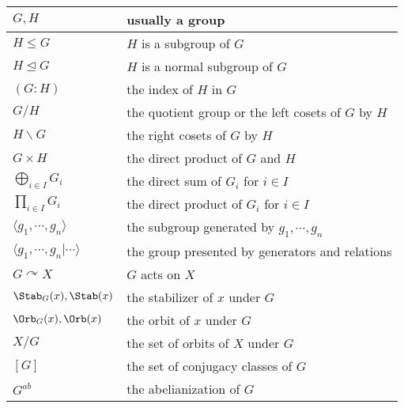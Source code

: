 \begin{longtable}{ll}
    \hline
    $G,H$ & usually a group \\ \hline
    $H\le G$ & $H$ is a subgroup of $G$ \\ \hline
    $H\unlhd G$ & $H$ is a normal subgroup of $G$ \\ \hline
    $(G:H)$ & the index of $H$ in $G$ \\ \hline
    $G/H$ & the quotient group or the left cosets of $G$ by $H$ \\ \hline
    $H\backslash G$ & the right cosets of $G$ by $H$ \\ \hline
    $G\times H$ & the direct product of $G$ and $H$ \\ \hline
    $\bigoplus_{i\in I}{G_i}$ & the direct sum of $G_i$ for $i\in I$ \\ \hline
    $\prod_{i\in I}{G_i}$ & the direct product of $G_i$ for $i\in I$ \\ \hline
    $\langle g_1,\cdots,g_n\rangle$ & the subgroup generated by $g_1,\cdots,g_n$ \\ \hline
    $\langle g_1,\cdots,g_n|\cdots\rangle$ & the group presented by generators and relations \\ \hline
    $G\curvearrowright X$ & $G$ acts on $X$ \\ \hline
    $\Stab_G(x),\Stab(x)$ & the stabilizer of $x$ under $G$ \\ \hline
    $\Orb_G(x),\Orb(x)$ & the orbit of $x$ under $G$ \\ \hline
    $X/G$ & the set of orbits of $X$ under $G$ \\ \hline
    $[G]$ & the set of conjugacy classes of $G$ \\ \hline
    $G^{ab}$ & the abelianization of $G$ \\ \hline
\end{longtable}
